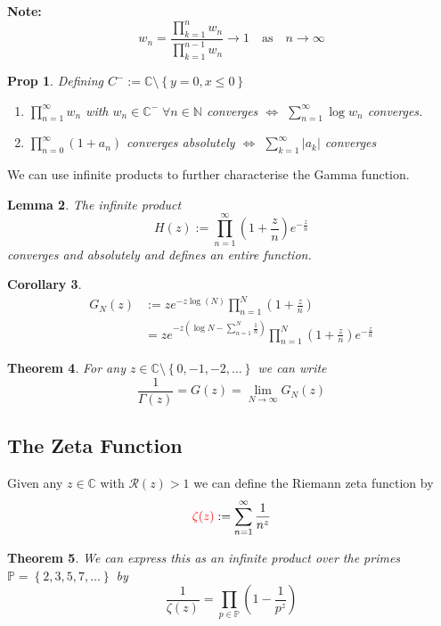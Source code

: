 \documentclass[11pt]{article}
\newcommand{\defeq}{:=}
\newcommand{\abs}[1]{\left|#1\right|}
\newcommand{\C}{\mathbb{C}}
\newcommand{\N}{\mathbb{N}}
\newenvironment{defin}
	{\begin{mdframed}[backgroundcolor=white, roundcorner=5pt, linewidth=1pt]}
	{\end{mdframed}}
\newcommand{\mdf}[1]{{\color{red} #1}}
\newenvironment{note}
	{\begin{mdframed}[backgroundcolor=white, linecolor=red, roundcorner=5pt, linewidth=1pt]\bfseries{Note:}\normalfont}
	{\end{mdframed}}
\newtheorem{theorem}{Theorem}[section]
\newtheorem{cor}[theorem]{Corollary}
\newtheorem{prop}[theorem]{Prop}
\newtheorem{lemma}[theorem]{Lemma}
\begin{document}
\begin{note}
	\[
		w_n=\frac{\prod_{k=1}^n w_n}{\prod_{k=1}^{n-1} w_n}\to 1 \quad \text{as} \quad n\to\infty
	\]
\end{note}


\begin{prop}
Defining $C^-\defeq\C\setminus\left\{y=0, x\leq 0\right\}$
\begin{enumerate}[label=(\alph*)]
	\item $\prod_{n=1}^\infty w_n$ with $w_n\in\C^-\;\forall n\in\N$ converges $\iff$ $\sum_{n=1}^{\infty}\log w_n$ converges.
	\item $\prod_{n=0}^\infty(1+a_n)$ converges absolutely $\iff$ $\sum_{k=1}^\infty\abs{a_k}$ converges
\end{enumerate}
\end{prop}

We can use infinite products to further characterise the Gamma function.

\begin{lemma}
The infinite product
\[
	H(z)\defeq\prod_{n=1}^\infty \left(1+\frac{z}{n}\right)e^{-\frac{z}{n}}
\]
converges and absolutely and defines an entire function.
\end{lemma}

\begin{cor}
	\begin{align*}
		G_N(z)&\defeq z e^{-z\log(N)}\prod_{n=1}^N\left(1+\frac{z}{n}\right)	\\
			  &= ze^{-z\left(\log N - \sum_{n=1}^{N}\frac{1}{n}\right)}\prod_{n=1}^N\left(1+\frac{z}{n}\right)e^{-\frac{z}{n}}
	\end{align*}
\end{cor}

\begin{theorem}
For any $z\in\C\setminus\left\{0, -1, -2, \dots \right\}$ we can write
\[
	\frac{1}{\Gamma(z)}=G(z)=\lim_{N\to\infty}G_N(z)
\]
\end{theorem}

\subsection{The Zeta Function}
\begin{defin}
Given any $z\in\C$ with $\mathcal{R}(z)>1$ we can define the \mdf{Riemann zeta function} by
\[
	\mdf{\zeta(z)}\defeq\sum_{n=1}^{\infty}\frac{1}{n^z}
\]
\end{defin}

\begin{theorem}
We can express this as an infinite product over the primes $\mathbb{P}=\left\{2, 3, 5, 7, \dots\right\}$ by
\[
	\frac{1}{\zeta(z)}= \prod_{p\in\mathbb{P}}\left(1-\frac{1}{p^z}\right)
\]
\end{theorem}
\end{document}
